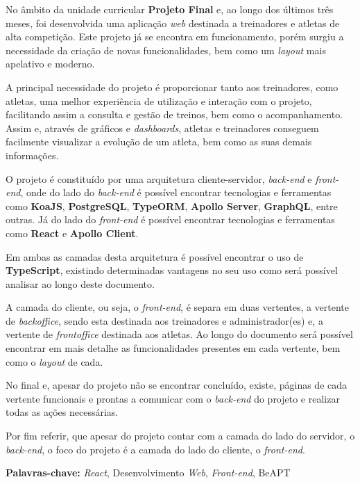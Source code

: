
No âmbito da unidade curricular \textbf{Projeto Final} e, ao longo dos últimos três meses, foi desenvolvida uma aplicação \textit{web} destinada a treinadores e atletas de alta competição. Este projeto já se encontra em funcionamento, porém surgiu a necessidade da criação de novas funcionalidades, bem como um \textit{layout} mais apelativo e moderno.

A principal necessidade do projeto é proporcionar tanto aos treinadores, como atletas, uma melhor experiência de utilização e interação com o projeto, facilitando assim a consulta e gestão de treinos, bem como o acompanhamento. Assim e, através de gráficos e \textit{dashboards}, atletas e treinadores conseguem facilmente visualizar a evolução de um atleta, bem como as suas demais informações.

O projeto é constituído por uma arquitetura cliente-servidor, \textit{back-end} e \textit{front-end}, onde do lado do \textit{back-end} é possível encontrar tecnologias e ferramentas como \textbf{KoaJS}, \textbf{PostgreSQL}, \textbf{TypeORM}, \textbf{Apollo Server}, \textbf{GraphQL}, entre outras. Já do lado do \textit{front-end} é possível encontrar tecnologias e ferramentas como \textbf{React} e \textbf{Apollo Client}.

Em ambas as camadas desta arquitetura é possível encontrar o uso de \textbf{TypeScript}, existindo determinadas vantagens no seu uso como será possível analisar ao longo deste documento.

A camada do cliente, ou seja, o \textit{front-end}, é separa em duas vertentes, a vertente de \textit{backoffice}, sendo esta destinada aos treinadores e administrador(es) e, a vertente de \textit{frontoffice} destinada aos atletas. Ao longo do documento será possível encontrar em mais detalhe as funcionalidades presentes em cada vertente, bem como o \textit{layout} de cada.

No final e, apesar do projeto não se encontrar concluído, existe, páginas de cada vertente funcionais e prontas a comunicar com o \textit{back-end} do projeto e realizar todas as ações necessárias.

Por fim referir, que apesar do projeto contar com a camada do lado do servidor, o \textit{back-end}, o foco do projeto é a camada do lado do cliente, o \textit{front-end}.

\vfill

\textbf{Palavras-chave:} \textit{React}, Desenvolvimento \textit{Web}, \textit{Front-end}, BeAPT

\newpage